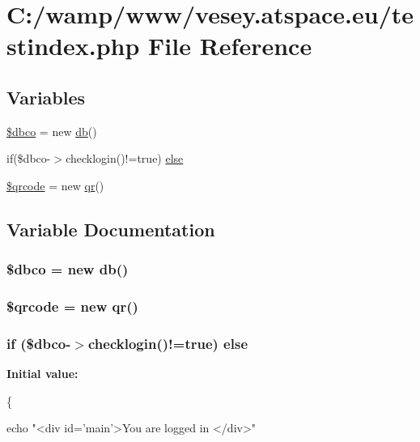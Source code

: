 \hypertarget{testindex_8php}{\section{C\-:/wamp/www/vesey.atspace.\-eu/testindex.php File Reference}
\label{testindex_8php}
}
\subsection*{Variables}
\begin{DoxyCompactItemize}
\item 
\hyperlink{testindex_8php_a2998f304f663e07feaa31e5df9d715dc}{\$dbco} = new \hyperlink{classdb}{db}()
\item 
if(\$dbco-\/$>$checklogin()!=true) \hyperlink{testindex_8php_a0da35c754a10b2ea574c4cc3d8e7c571}{else}
\item 
\hyperlink{testindex_8php_ab3481c277594c83f6b0beb7e95800356}{\$qrcode} = new \hyperlink{classqr}{qr}()
\end{DoxyCompactItemize}


\subsection{Variable Documentation}
\hypertarget{testindex_8php_a2998f304f663e07feaa31e5df9d715dc}{
\subsubsection[{\$dbco}]{\setlength{\rightskip}{0pt plus 5cm}\$dbco = new {\bf db}()}}\label{testindex_8php_a2998f304f663e07feaa31e5df9d715dc}
\hypertarget{testindex_8php_ab3481c277594c83f6b0beb7e95800356}{
\subsubsection[{\$qrcode}]{\setlength{\rightskip}{0pt plus 5cm}\$qrcode = new {\bf qr}()}}\label{testindex_8php_ab3481c277594c83f6b0beb7e95800356}
\hypertarget{testindex_8php_a0da35c754a10b2ea574c4cc3d8e7c571}{
\subsubsection[{else}]{\setlength{\rightskip}{0pt plus 5cm}if (\$dbco-\/$>$checklogin()!=true) else}}\label{testindex_8php_a0da35c754a10b2ea574c4cc3d8e7c571}
{\bfseries Initial value\-:}
\begin{DoxyCode}
\{
  

  
  echo \textcolor{stringliteral}{"<div id='main'>You are logged in </div>"}
\end{DoxyCode}
